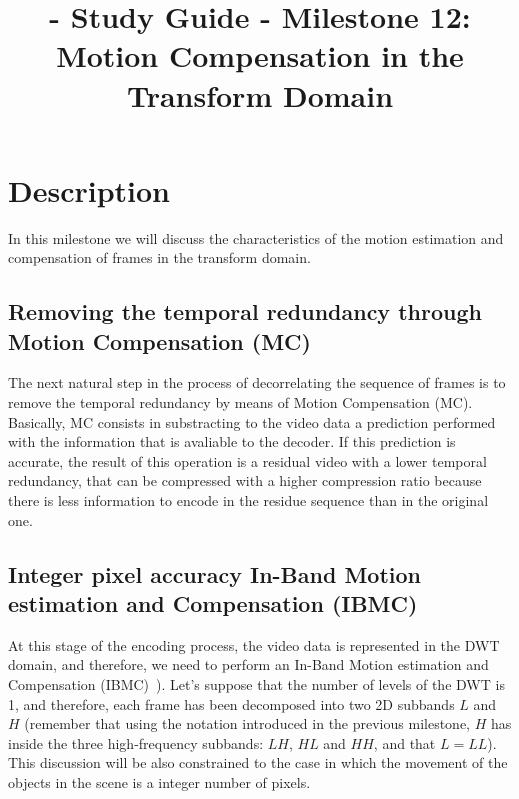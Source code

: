 
\title{\SM{} - Study Guide - Milestone 12: Motion Compensation in the Transform Domain}

\maketitle

\tableofcontents

\section{Description}

In this milestone we will discuss the characteristics of the motion
estimation and compensation of frames
in the transform domain.

\subsection{Removing the temporal redundancy through Motion Compensation (MC)}
The next natural step in the process of decorrelating the sequence of
frames is to remove the temporal redundancy by means of Motion
Compensation (MC). Basically, MC consists in substracting to the video
data a prediction performed with the information that is avaliable to
the decoder. If this prediction is accurate, the result of this
operation is a residual video with a lower temporal redundancy, that
can be compressed with a higher compression ratio because there is
less information to encode in the residue sequence than in the
original one.

\subsection{Integer pixel accuracy In-Band Motion estimation and Compensation (IBMC)}
At this stage of the encoding process, the video data is represented
in the DWT domain, and therefore, we need to perform an In-Band Motion
estimation and Compensation
(IBMC)~\cite{andreopoulos2005complete}). Let's suppose that the number
of levels of the DWT is 1, and therefore, each frame has been
decomposed into two 2D subbands $L$ and $H$ (remember that using the
notation introduced in the previous milestone, $H$ has inside the
three high-frequency subbands: $LH$, $HL$ and $HH$, and that
$L=LL$). This discussion will be also constrained to the case in which
the movement of the objects in the scene is a integer number of
pixels.

